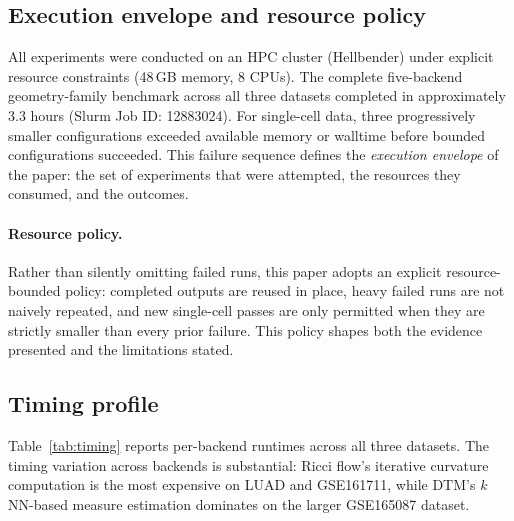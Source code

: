 \documentclass[11pt]{article}
\begin{document}
\subsection{Execution envelope and resource policy}

All experiments were conducted on an HPC cluster (Hellbender) under explicit resource constraints (48\,GB memory, 8 CPUs).
The complete five-backend geometry-family benchmark across all three datasets completed in approximately 3.3 hours (Slurm Job ID: 12883024).
For single-cell data, three progressively smaller configurations exceeded available memory or walltime before bounded configurations succeeded.
This failure sequence defines the \emph{execution envelope} of the paper: the set of experiments that were attempted, the resources they consumed, and the outcomes.

\paragraph{Resource policy.}
Rather than silently omitting failed runs, this paper adopts an explicit resource-bounded policy: completed outputs are reused in place, heavy failed runs are not naively repeated, and new single-cell passes are only permitted when they are strictly smaller than every prior failure.
This policy shapes both the evidence presented and the limitations stated.

\subsection{Timing profile}

Table~\ref{tab:timing} reports per-backend runtimes across all three datasets.
The timing variation across backends is substantial: Ricci flow's iterative curvature computation is the most expensive on LUAD and GSE161711, while DTM's $k$NN-based measure estimation dominates on the larger GSE165087 dataset.
\end{document}
